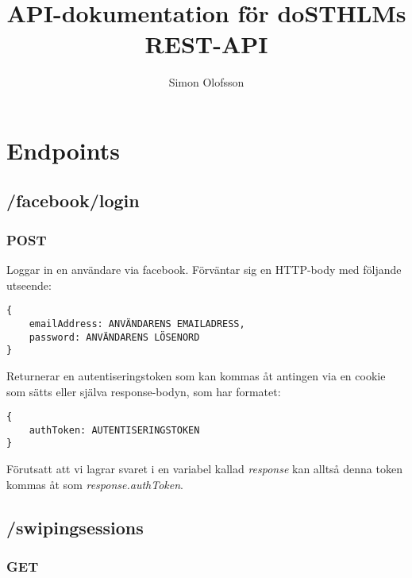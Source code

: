\documentclass{article}
\title{API-dokumentation för doSTHLMs REST-API}
\author{Simon Olofsson}
\date{}
\begin{document}

\maketitle

\newpage

\tableofcontents

\newpage

\section*{Endpoints}

\subsection*{/facebook/login}

\subsubsection*{POST}

Loggar in en användare via facebook. Förväntar sig en HTTP-body med följande utseende:

\begin{lstlisting}
{
	emailAddress: ANVÄNDARENS EMAILADRESS,
	password: ANVÄNDARENS LÖSENORD
}
\end{lstlisting}

\noindent Returnerar en autentiseringstoken som kan kommas åt antingen via en cookie som sätts
eller själva response-bodyn, som har formatet:

\begin{lstlisting}
{
	authToken: AUTENTISERINGSTOKEN
}
\end{lstlisting}

\noindent Förutsatt att vi lagrar svaret i en variabel kallad \textit{response} kan alltså denna token 
kommas åt som \textit{response.authToken}.

\subsection*{/swipingsessions}

\subsubsection*{GET}
\end{document}
